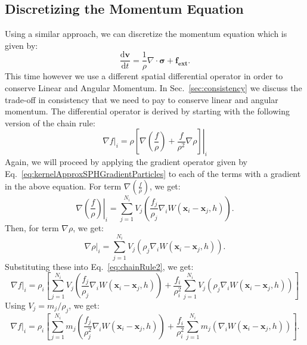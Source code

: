 \documentclass{article}
\newcommand{\vx}{\mathbf{x}}
\newcommand{\dd}{\mathrm{d}}
\newcommand{\vv}{\mathbf{v}}
\newcommand{\vsigma}{\bm{\sigma}}
\begin{document}
\subsection*{Discretizing the Momentum Equation}
Using a similar approach, we can discretize the momentum equation which is given by:
\begin{equation}
  \label{eq:MomentumEquation}
  \frac{\dd \vv}{\dd t}  = \frac{1}{\rho} \nabla \cdot \vsigma + \mathbf{f_{ext}}.
\end{equation}
This time however we use a different spatial differential operator in order to conserve Linear and Angular Momentum. In Sec.~\ref{sec:consistency} we discuss the trade-off in consistency that we need to pay to conserve linear and angular momentum. The differential operator is derived by starting with the following version of the chain rule:
\begin{equation}
  \label{eq:chainRule2}
  \nabla f|_i = \left. \rho \left[\nabla \left( \frac{f}{\rho} \right) + \frac{f}{\rho^2}\nabla \rho \right]\right|_i
\end{equation}
Again, we will proceed by applying the gradient operator given by Eq.~\ref{eq:kernelApproxSPHGradientParticles} to each of the terms with a gradient in the above equation. For term $\nabla \left( \frac{f}{\rho} \right)$, we get:
\begin{equation}
  \label{eq:momentumTerm1}
  \nabla \left. \left( \frac{f}{\rho} \right)\right|_i = \sum_{j=1}^{N_i} V_j \left( \frac{f_j}{\rho_j} \nabla_i W(\vx_i - \vx_j, h) \right).
\end{equation}
Then, for term $\nabla \rho$, we get:
\begin{equation}
  \label{eq:momentumTerm2}
  \nabla \rho|_i = \sum_{j=1}^{N_i} V_j \left( \rho_j \nabla_i W(\vx_i - \vx_j, h) \right).
\end{equation}
Substituting these into Eq.~\ref{eq:chainRule2}, we get:
\begin{equation}
  \nabla f|_i =  \rho_i \left[\sum_{j=1}^{N_i} V_j \left( \frac{f_j}{\rho_j} \nabla_i W(\vx_i - \vx_j, h) \right) + \frac{f_i}{\rho_i^2} \sum_{j=1}^{N_i} V_j \left( \rho_j \nabla_i W(\vx_i - \vx_j, h) \right) \right]
\end{equation}
Using $V_j = m_j / \rho_j$, we get:
\begin{equation}
  \nabla f|_i =  \rho_i \left[\sum_{j=1}^{N_i} m_j \left( \frac{f_j}{\rho_j^2} \nabla_i W(\vx_i - \vx_j, h) \right) + \frac{f_i}{\rho_i^2} \sum_{j=1}^{N_i} m_j \left(\nabla_i W(\vx_i - \vx_j, h) \right) \right].
\end{equation}
\end{document}
